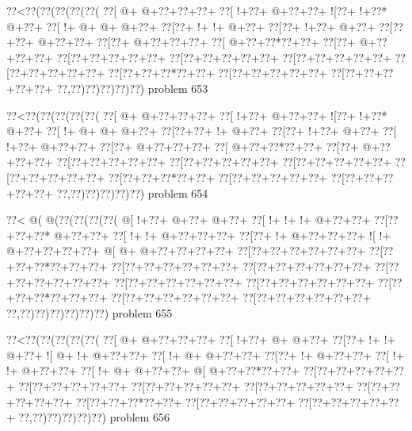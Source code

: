 \vbox{\vbox{\goo
\0??<\0??(\0??(\0??(\0??(\0??(
\0??[\- @+\- @+\0??+\0??+\0??+
\0??[\- !+\0??+\- @+\0??+\0??+
\- ![\0??+\- !+\0??*\- @+\0??+
\0??[\- !+\- @+\- @+\- @+\0??+
\0??[\0??+\- !+\- !+\- @+\0??+
\0??[\0??+\- !+\0??+\- @+\0??+
\0??[\0??+\0??+\- @+\0??+\0??+
\0??[\0??+\- @+\0??+\0??+\0??+
\0??[\- @+\0??+\0??*\0??+\0??+
\0??[\0??+\- @+\0??+\0??+\0??+
\0??[\0??+\0??+\0??+\0??+\0??+
\0??[\0??+\0??+\0??+\0??+\0??+
\0??[\0??+\0??+\0??+\0??+\0??+
\0??[\0??+\0??+\0??+\0??+\0??+
\0??[\0??+\0??+\0??*\0??+\0??+
\0??[\0??+\0??+\0??+\0??+\0??+
\0??[\0??+\0??+\0??+\0??+\0??+
\0??,\0??)\0??)\0??)\0??)\0??)
}
\hfil problem 653\hfil\break
}

\vbox{\vbox{\goo
\0??<\0??(\0??(\0??(\0??(\0??(
\0??[\- @+\- @+\0??+\0??+\0??+
\0??[\- !+\0??+\- @+\0??+\0??+
\- ![\0??+\- !+\0??*\- @+\0??+
\0??[\- !+\- @+\- @+\- @+\0??+
\0??[\0??+\0??+\- !+\- @+\0??+
\0??[\0??+\- !+\0??+\- @+\0??+
\0??[\- !+\0??+\- @+\0??+\0??+
\0??[\0??+\- @+\0??+\0??+\0??+
\0??[\- @+\0??+\0??*\0??+\0??+
\0??[\0??+\- @+\0??+\0??+\0??+
\0??[\0??+\0??+\0??+\0??+\0??+
\0??[\0??+\0??+\0??+\0??+\0??+
\0??[\0??+\0??+\0??+\0??+\0??+
\0??[\0??+\0??+\0??+\0??+\0??+
\0??[\0??+\0??+\0??*\0??+\0??+
\0??[\0??+\0??+\0??+\0??+\0??+
\0??[\0??+\0??+\0??+\0??+\0??+
\0??,\0??)\0??)\0??)\0??)\0??)
}
\hfil problem 654\hfil\break
}

\vbox{\vbox{\goo
\0??<\- @(\- @(\0??(\0??(\0??(\0??(
\- @[\- !+\0??+\- @+\0??+\- @+\0??+
\0??[\- !+\- !+\- !+\- @+\0??+\0??+
\0??[\0??+\0??+\0??*\- @+\0??+\0??+
\0??[\- !+\- !+\- @+\0??+\0??+\0??+
\0??[\0??+\- !+\- @+\0??+\0??+\0??+
\- ![\- !+\- @+\0??+\0??+\0??+\0??+
\- @[\- @+\- @+\0??+\0??+\0??+\0??+
\0??[\0??+\0??+\0??+\0??+\0??+\0??+
\0??[\0??+\0??+\0??*\0??+\0??+\0??+
\0??[\0??+\0??+\0??+\0??+\0??+\0??+
\0??[\0??+\0??+\0??+\0??+\0??+\0??+
\0??[\0??+\0??+\0??+\0??+\0??+\0??+
\0??[\0??+\0??+\0??+\0??+\0??+\0??+
\0??[\0??+\0??+\0??+\0??+\0??+\0??+
\0??[\0??+\0??+\0??*\0??+\0??+\0??+
\0??[\0??+\0??+\0??+\0??+\0??+\0??+
\0??[\0??+\0??+\0??+\0??+\0??+\0??+
\0??,\0??)\0??)\0??)\0??)\0??)\0??)
}
\hfil problem 655\hfil\break
}

\vbox{\vbox{\goo
\0??<\0??(\0??(\0??(\0??(\0??(
\0??[\- @+\- @+\0??+\0??+\0??+
\0??[\- !+\0??+\- @+\- @+\0??+
\0??[\0??+\- !+\- !+\- @+\0??+
\- ![\- @+\- !+\- @+\0??+\0??+
\0??[\- !+\- @+\- @+\0??+\0??+
\0??[\0??+\- !+\- @+\0??+\0??+
\0??[\- !+\- !+\- @+\0??+\0??+
\0??[\- !+\- @+\- @+\0??+\0??+
\- @[\- @+\0??+\0??*\0??+\0??+
\0??[\0??+\0??+\0??+\0??+\0??+
\0??[\0??+\0??+\0??+\0??+\0??+
\0??[\0??+\0??+\0??+\0??+\0??+
\0??[\0??+\0??+\0??+\0??+\0??+
\0??[\0??+\0??+\0??+\0??+\0??+
\0??[\0??+\0??+\0??*\0??+\0??+
\0??[\0??+\0??+\0??+\0??+\0??+
\0??[\0??+\0??+\0??+\0??+\0??+
\0??,\0??)\0??)\0??)\0??)\0??)
}
\hfil problem 656\hfil\break
}

